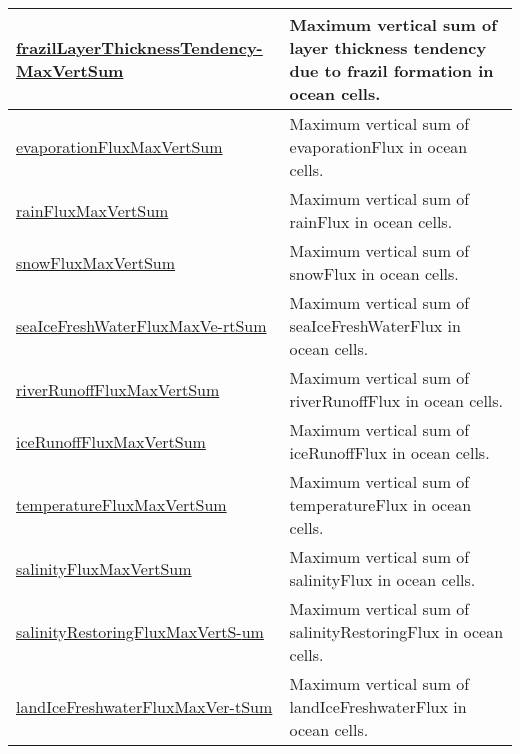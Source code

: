 {\begin{center}
\begin{longtable}{| p{2.0in} | p{4.0in} |}
    \hline
    \hyperref[subsec:var_sec_globalStatsAM_frazilLayerThicknessTendencyMaxVertSum]{frazilLayerThicknessTendency-}\hyperref[subsec:var_sec_globalStatsAM_frazilLayerThicknessTendencyMaxVertSum]{MaxVertSum}  & Maximum vertical sum of layer thickness tendency due to frazil formation in ocean cells. \\
    \hline
    \hyperref[subsec:var_sec_globalStatsAM_evaporationFluxMaxVertSum]{evaporationFluxMaxVertSum} & Maximum vertical sum of evaporationFlux in ocean cells. \\
    \hline
    \hyperref[subsec:var_sec_globalStatsAM_rainFluxMaxVertSum]{rainFluxMaxVertSum} & Maximum vertical sum of rainFlux in ocean cells. \\
    \hline
    \hyperref[subsec:var_sec_globalStatsAM_snowFluxMaxVertSum]{snowFluxMaxVertSum} & Maximum vertical sum of snowFlux in ocean cells. \\
    \hline
    \hyperref[subsec:var_sec_globalStatsAM_seaIceFreshWaterFluxMaxVertSum]{seaIceFreshWaterFluxMaxVe-}\hyperref[subsec:var_sec_globalStatsAM_seaIceFreshWaterFluxMaxVertSum]{rtSum}  & Maximum vertical sum of seaIceFreshWaterFlux in ocean cells. \\
    \hline
    \hyperref[subsec:var_sec_globalStatsAM_riverRunoffFluxMaxVertSum]{riverRunoffFluxMaxVertSum} & Maximum vertical sum of riverRunoffFlux in ocean cells. \\
    \hline
    \hyperref[subsec:var_sec_globalStatsAM_iceRunoffFluxMaxVertSum]{iceRunoffFluxMaxVertSum} & Maximum vertical sum of iceRunoffFlux in ocean cells. \\
    \hline
    \hyperref[subsec:var_sec_globalStatsAM_temperatureFluxMaxVertSum]{temperatureFluxMaxVertSum} & Maximum vertical sum of temperatureFlux in ocean cells. \\
    \hline
    \hyperref[subsec:var_sec_globalStatsAM_salinityFluxMaxVertSum]{salinityFluxMaxVertSum} & Maximum vertical sum of salinityFlux in ocean cells. \\
    \hline
    \hyperref[subsec:var_sec_globalStatsAM_salinityRestoringFluxMaxVertSum]{salinityRestoringFluxMaxVertS-}\hyperref[subsec:var_sec_globalStatsAM_salinityRestoringFluxMaxVertSum]{um}  & Maximum vertical sum of salinityRestoringFlux in ocean cells. \\
    \hline
    \hyperref[subsec:var_sec_globalStatsAM_landIceFreshwaterFluxMaxVertSum]{landIceFreshwaterFluxMaxVer-}\hyperref[subsec:var_sec_globalStatsAM_landIceFreshwaterFluxMaxVertSum]{tSum}  & Maximum vertical sum of landIceFreshwaterFlux in ocean cells. \\

\end{longtable}
\end{center}}
